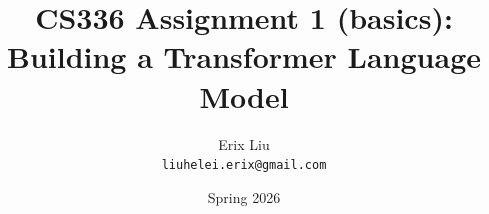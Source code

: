 \documentclass[11pt, a4paper]{article}
\title{%
    CS336 Assignment 1 (basics): \\
    Building a Transformer Language Model
}
\author{Erix Liu \\ \texttt{liuhelei.erix@gmail.com}}
\date{Spring 2026}
\begin{document}
\maketitle
\thispagestyle{empty}

\tableofcontents
\newpage


\FloatBarrier

\FloatBarrier

\FloatBarrier

\FloatBarrier

\FloatBarrier

\FloatBarrier

\FloatBarrier



\clearpage
\begin{appendices}





\end{appendices}
\end{document}
